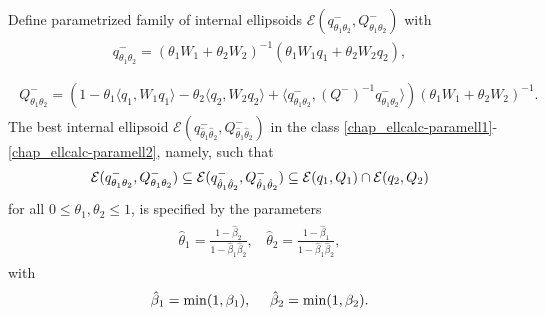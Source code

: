 \documentclass[letterpaper,10pt,english]{sphinxmanual}
\begin{document}
Define parametrized family of internal ellipsoids
${\mathcal E}(q^-_{\theta_1\theta_2},Q^-_{\theta_1\theta_2})$ with
\label{chap_ellcalc:equation-paramell1}\begin{gather}
\begin{split}q^-_{\theta_1\theta_2}  =  (\theta_1W_1 +
\theta_2W_2)^{-1}(\theta_1W_1q_1 + \theta_2W_2q_2),\\\end{split}\label{chap_ellcalc-paramell1}
\end{gather}\label{chap_ellcalc:equation-paramell2}\begin{gather}
\begin{split}Q^-_{\theta_1\theta_2} =  (1 - \theta_1\langle q_1,W_1q_1\rangle -
\theta_2\langle q_2,W_2q_2\rangle +
\langle q^-_{\theta_1\theta_2},(Q^-)^{-1}q^-_{\theta_1\theta_2}\rangle)
(\theta_1W_1 + \theta_2W_2)^{-1} .\end{split}\label{chap_ellcalc-paramell2}
\end{gather}
The best internal ellipsoid
${\mathcal E}(q^-_{\hat{\theta}_1\hat{\theta}_2},Q^-_{\hat{\theta}_1\hat{\theta}_2})$
in the class \eqref{chap_ellcalc-paramell1}-\eqref{chap_ellcalc-paramell2}, namely, such that
\begin{gather}
\begin{split}{\mathcal E}(q^-_{{\theta}_1{\theta}_2},Q^-_{{\theta}_1{\theta}_2})\subseteq
{\mathcal E}(q^-_{\hat{\theta}_1\hat{\theta}_2},Q^-_{\hat{\theta}_1\hat{\theta}_2})
\subseteq {\mathcal E}(q_1,Q_1)\cap{\mathcal E}(q_2,Q_2)\end{split}\notag
\end{gather}
for all $0\leqslant\theta_1,\theta_2\leqslant1$, is specified by
the parameters
\label{chap_ellcalc:equation-thetapar}\begin{gather}
\begin{split}\hat{\theta}_1 = \frac{1-\hat{\beta}_2}{1-\hat{\beta}_1\hat{\beta}_2}, ~~~~
\hat{\theta}_2 = \frac{1-\hat{\beta}_1}{1-\hat{\beta}_1\hat{\beta}_2},\end{split}\label{chap_ellcalc-thetapar}
\end{gather}
with
\begin{gather}
\begin{split}\hat{\beta}_1=\min(1,\beta_1), ~~~~ \hat{\beta}_2=\min(1,\beta_2).\end{split}\notag\\\begin{split}\end{split}\notag
\end{gather}
\end{document}
